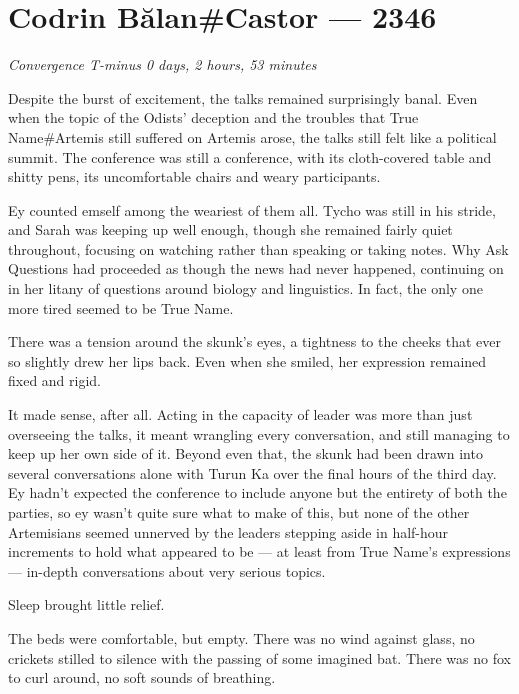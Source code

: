 \hypertarget{codrin-bux103lancastor-2346}{%
\chapter{Codrin Bălan\#Castor — 2346}\label{codrin-bux103lancastor-2346}}

\begin{center}
\emph{Convergence T-minus 0 days, 2 hours, 53 minutes}
\end{center}

Despite the burst of excitement, the talks remained surprisingly banal. Even when the topic of the Odists' deception and the troubles that True Name\#Artemis still suffered on Artemis arose, the talks still felt like a political summit. The conference was still a conference, with its cloth-covered table and shitty pens, its uncomfortable chairs and weary participants.

Ey counted emself among the weariest of them all. Tycho was still in his stride, and Sarah was keeping up well enough, though she remained fairly quiet throughout, focusing on watching rather than speaking or taking notes. Why Ask Questions had proceeded as though the news had never happened, continuing on in her litany of questions around biology and linguistics. In fact, the only one more tired seemed to be True Name.

There was a tension around the skunk's eyes, a tightness to the cheeks that ever so slightly drew her lips back. Even when she smiled, her expression remained fixed and rigid.

It made sense, after all. Acting in the capacity of leader was more than just overseeing the talks, it meant wrangling every conversation, and still managing to keep up her own side of it. Beyond even that, the skunk had been drawn into several conversations alone with Turun Ka over the final hours of the third day. Ey hadn't expected the conference to include anyone but the entirety of both the parties, so ey wasn't quite sure what to make of this, but none of the other Artemisians seemed unnerved by the leaders stepping aside in half-hour increments to hold what appeared to be — at least from True Name's expressions — in-depth conversations about very serious topics.

Sleep brought little relief.

The beds were comfortable, but empty. There was no wind against glass, no crickets stilled to silence with the passing of some imagined bat. There was no fox to curl around, no soft sounds of breathing.

